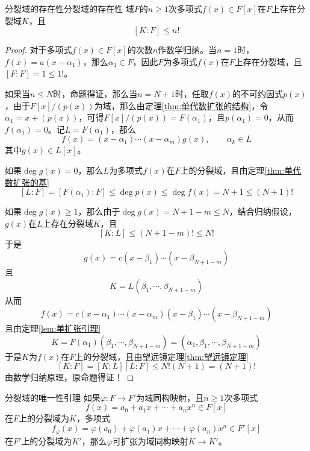 \documentclass[lang = cn, scheme = chinese, thmcnt = section]{elegantbook}
\begin{document}
\begin{theorem}{分裂域的存在性}{分裂域的存在性}
	域$F$的$n\ge 1$次多项式$f(x)\in F[x]$在$F$上存在分裂域$K$，且
	$$
	[K:F]\le n!
	$$
\end{theorem}

\begin{proof}
	对于多项式$f(x)\in F[x]$的次数$n$作数学归纳。当$n=1$时，$f(x)=a(x-\alpha_1)$，那么$\alpha_1\in F$，因此$F$为多项式$f(x)$在$F$上存在分裂域，且$[F:F]=1\le 1!$。
	
	如果当$n\le N$时，命题得证，那么当$n=N+1$时，任取$f(x)$的不可约因式$p(x)$，由于$F[x]/(p(x))$为域，那么由定理\ref{thm:单代数扩张的结构}，令$\alpha_1=x+(p(x))$，可得$F[x]/(p(x))=F(\alpha_1)$，且$p(\alpha_1)=0$，从而$f(\alpha_1)=0$。记$L=F(\alpha_1)$，那么
	$$
	f(x)=(x-\alpha_1)\cdots(x-\alpha_m)g(x),\qquad \alpha_k\in L
	$$
	其中$g(x)\in L[x]$。
	
	如果$\deg g(x)=0$，那么$L$为多项式$f(x)$在$F$上的分裂域，且由定理\ref{thm:单代数扩张的基}
	$$
	[L:F]=[F(\alpha_1):F]\le \deg p(x)\le \deg f(x)=N+1\le (N+1)!
	$$
	
	如果$\deg g(x)\ge 1$，那么由于$\deg g(x)=N+1-m\le N$，结合归纳假设，$g(x)$在$L$上存在分裂域$K$，且
	$$
	[K:L]\le (N+1-m)!\le N!
	$$
	于是
	$$
	g(x)=c(x-\beta_1)\cdots(x-\beta_{N+1-m})
	$$
	且
	$$
	K=L(\beta_1,\cdots,\beta_{N+1-m})
	$$
	从而
	$$
	f(x)=c(x-\alpha_1)\cdots(x-\alpha_m)(x-\beta_1)\cdots(x-\beta_{N+1-m})
	$$
	且由定理\ref{lem:单扩张引理}
	$$
	K=F(\alpha_1)(\beta_1,\cdots,\beta_{N+1-m})=(\alpha_1,\beta_1,\cdots,\beta_{N+1-m})
	$$
	于是$K$为$f(x)$在$F$上的分裂域，且由望远镜定理\ref{thm:望远镜定理}
	$$
	[K:F]=[K:L][L:F]\le N!(N+1)=(N+1)!
	$$
	由数学归纳原理，原命题得证！
\end{proof}

\begin{lemma}{}{分裂域的唯一性引理}
	如果$\varphi:F\to F'$为域同构映射，且$n\ge 1$次多项式
	$$
	f(x)=a_0+a_1x+\cdots +a_nx^n\in F[x]
	$$
	在$F$上的分裂域为$K$，多项式
	$$
	f_\varphi(x)=\varphi(a_0)+\varphi(a_1)x+\cdots +\varphi(a_n)x^n\in F'[x]
	$$
	在$F'$上的分裂域为$K'$，那么$\varphi$可扩张为域同构映射$K\to K'$。
\end{lemma}
\end{document}
